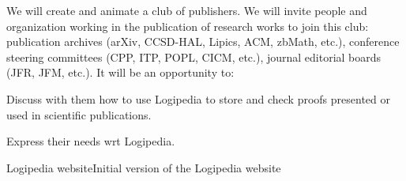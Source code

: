 \begin{workpackage}[id=dissemination,wphases=0-48,type=MGT,
  short=Dissemination,%
  title={Dissemination, communication and exploitation},
  lead=Inr]
\begin{tasklist}
\begin{task}[id=teachers-club,
      title=Expanding the use of Logipedia in education,
      lead=Str,StrRM=2]
  \end{task}

  \begin{task}[id=publishers-club,
      title=Expanding the use of Logipedia in publishing,
      lead=Zib,ZibRM=14]
    We will create and animate a club of publishers. We will invite
    people and organization working in the publication of research
    works to join this club: publication archives (arXiv, CCSD-HAL,
    Lipics, ACM, zbMath, etc.), conference steering committees (CPP,
    ITP, POPL, CICM, etc.), journal editorial boards (JFR, JFM,
    etc.). It will be an opportunity to:
    \begin{compactitem}
    \item Discuss with them how to use Logipedia to store and check
      proofs presented or used in scientific publications.
    \item Express their needs wrt Logipedia.
    \end{compactitem}
  \end{task}

\end{tasklist}

\begin{wpdelivs}
  
  \begin{wpdeliv}[due=1,miles=startup,id=requirements,dissem=PU,nature=DEC,lead=Inr]{Logipedia website}Initial version of the Logipedia website
  \end{wpdeliv}

\end{wpdelivs}

\end{workpackage}


